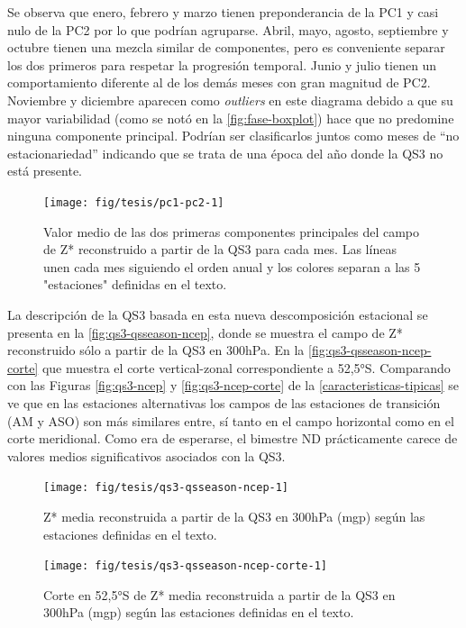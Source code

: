 \documentclass[spanish,a4paper,12pt,oneside]{book}
\begin{document}
Se observa que enero, febrero y marzo tienen preponderancia de la PC1 y
casi nulo de la PC2 por lo que podrían agruparse. Abril, mayo, agosto,
septiembre y octubre tienen una mezcla similar de componentes, pero es
conveniente separar los dos primeros para respetar la progresión
temporal. Junio y julio tienen un comportamiento diferente al de los
demás meses con gran magnitud de PC2. Noviembre y diciembre aparecen
como \emph{outliers} en este diagrama debido a que su mayor variabilidad
(como se notó en la \autoref{fig:fase-boxplot}) hace que no predomine
ninguna componente principal. Podrían ser clasificarlos juntos como
meses de ``no estacionariedad'' indicando que se trata de una época del
año donde la QS3 no está presente.

\begin{figure}
\texttt{[image: fig/tesis/pc1-pc2-1]} \caption{Valor medio de las dos primeras componentes principales del campo de Z* reconstruido a partir de la QS3 para cada mes. Las líneas unen cada mes siguiendo el orden anual y los colores separan a las 5 "estaciones" definidas en el texto.}\label{fig:pc1-pc2}
\end{figure}

La descripción de la QS3 basada en esta nueva descomposición estacional
se presenta en la \autoref{fig:qs3-qsseason-ncep}, donde se muestra el
campo de Z* reconstruido sólo a partir de la QS3 en 300hPa. En la
\autoref{fig:qs3-qsseason-ncep-corte} que muestra el corte
vertical-zonal correspondiente a 52,5°S. Comparando con las Figuras
\ref{fig:qs3-ncep} y \ref{fig:qs3-ncep-corte} de la
\autoref{caracteristicas-tipicas} se ve que en las estaciones
alternativas los campos de las estaciones de transición (AM y ASO) son
más similares entre, sí tanto en el campo horizontal como en el corte
meridional. Como era de esperarse, el bimestre ND prácticamente carece
de valores medios significativos asociados con la QS3.

\begin{figure}
\texttt{[image: fig/tesis/qs3-qsseason-ncep-1]} \caption{Z* media reconstruida a partir de la QS3 en 300hPa (mgp) según las estaciones definidas en el texto.}\label{fig:qs3-qsseason-ncep}
\end{figure}

\begin{figure}
\texttt{[image: fig/tesis/qs3-qsseason-ncep-corte-1]} \caption{Corte en 52,5°S de Z* media reconstruida a partir de la QS3 en 300hPa (mgp) según las estaciones definidas en el texto.}\label{fig:qs3-qsseason-ncep-corte}
\end{figure}
\end{document}
